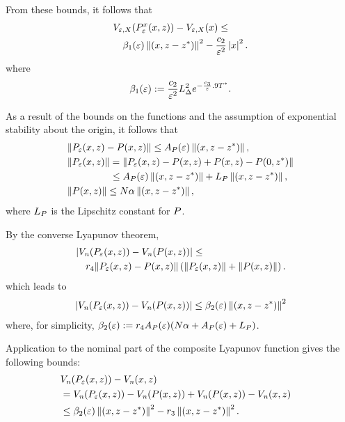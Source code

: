 \begin{frame}[t]
   {
    From these bounds, it follows that
    \begin{align*}
      \lefteqn{\Vex(\Pex\argsxz) - \Vex(\zdx) \leq}\\
      &&\bepsone \nzdxzst^{2} - \frac{c_{2}}{\resclfparam^{2}} \nzdx^{2}.
    \end{align*}
    where
    \begin{align*}
      \bepsone := \frac{c_{2}}{\resclfparam^{2}} \LDelta^{2}
      e^{-\frac{c_{3}}{\resclfparam} .9 \Tst}.
    \end{align*}
  }

   {
    As a result of the bounds on the \tti{} functions and the assumption of exponential stability about the origin, it follows that
    \begin{align*}
      &\| \Pe\argsxz - \P\argsxz \| \leq \Ae \nzdxzst,\\
      &\| \Pe\argsxz \| = \| \Pe\argsxz - \P\argsxz + \P\argsxz - \P\xzst\|\\
      & \hspace{4.4em} \leq \Ae \nzdxzst  + \LP\nzdxzst,\\
      &\| \P\argsxz \| \leq N \alpha \nzdxzst,
    \end{align*}
    where $\LP$ is the Lipschitz constant for $\P$.
  }

   {
    By the converse Lyapunov theorem,
    \begin{align*}
      \lefteqn{| \Vn(\Pe\argsxz) - \Vn(\P\argsxz) | \leq}\\
      &&r_{4} \| \Pe\argsxz - \P\argsxz \| \left( \|\Pe\argsxz\| + \|\P\argsxz\| \right).
    \end{align*}
    which leads to
    \begin{align*}
      \label{eq:Pe-P-beta}
      | \Vn(\Pe\argsxz) - \Vn(\P\argsxz) | \leq \bepstwo \nzdxzst^{2}
    \end{align*}
    where, for simplicity, $\bepstwo := r_{4} \Ae (N \alpha + \Ae  + \LP)$.
  }

   {
    Application to the nominal part of the composite Lyapunov function  gives
    the following bounds:
    \begin{align*}
      \lefteqn{\Vn(\Pe\argsxz) - \Vn\argsxz }\\
      &= \Vn(\Pe\argsxz) - \Vn(\P\argsxz) + \Vn(\P\argsxz) - \Vn\argsxz\\
      &\leq \bepstwo \nzdxzst^{2} - r_{3} \nzdxzst^{2}.
    \end{align*}
  }


\end{frame}
